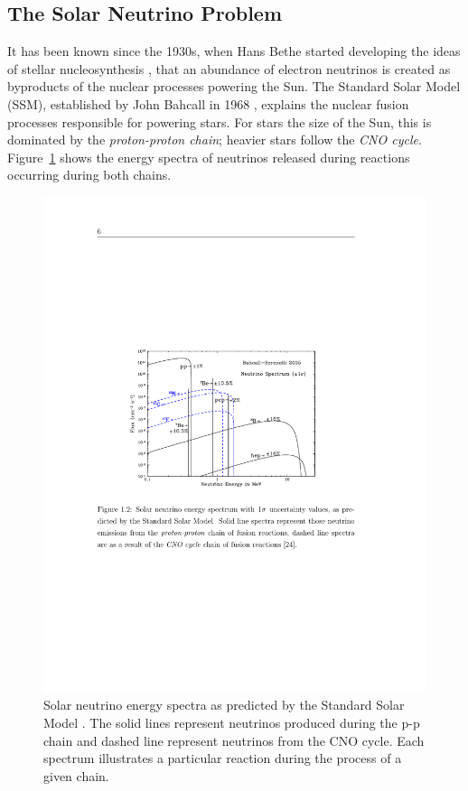 \subsection{The Solar Neutrino Problem}\label{SolarNeutrinoProblem}

It has been known since the 1930s, when Hans Bethe started developing the ideas of stellar nucleosynthesis \cite{Bethe1939}, that an abundance of electron neutrinos is created as byproducts of the nuclear processes powering the Sun.  The Standard Solar Model (SSM), established by John Bahcall in 1968 \cite{Bahcall1968}, explains the nuclear fusion processes responsible for powering stars.  For stars the size of the Sun, this is dominated by the \textit{proton-proton chain}; heavier stars follow the \textit{CNO cycle}.  Figure~\ref{fig:SolarNeutrinoCycles} shows the energy spectra of neutrinos released during reactions occurring during both chains.

\begin{figure}
\centering
  \includegraphics[width=12cm]{SolarNeutrinoCycles.pdf}
  \caption[Solar neutrino energy spectra as predicted by the Standard Solar Model.]{Solar neutrino energy spectra as predicted by the Standard Solar Model \cite{Bahcall2005}.  The solid lines represent neutrinos produced during the p-p chain and dashed line represent neutrinos from the CNO cycle.  Each spectrum illustrates a particular reaction during the process of a given chain.}
  \label{fig:SolarNeutrinoCycles}
\end{figure}


